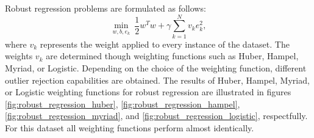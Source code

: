 \documentclass{article}
\begin{document}
        
        Robust regression problems are formulated as follows: 
        \begin{equation}\label{eq:robust_regression}
            \min_{w,b,e_k} \ \frac{1}{2} w^T w + \gamma \sum^N_{k=1} v_k e_k^2, 
        \end{equation}
        where $v_k$ represents the weight applied to every instance of the dataset. The weights $v_k$ are determined though weighting functions such as Huber, Hampel, Myriad, or Logistic. Depending on the choice of the weighting function, different outlier rejection capabilities are obtained. The results of Huber, Hampel, Myriad, or Logistic weighting functions for robust regression are illustrated in figures \ref{fig:robust_regression_huber}, \ref{fig:robust_regression_hampel}, \ref{fig:robust_regression_myriad}, and \ref{fig:robust_regression_logistic}, respectfully. For this dataset all weighting functions perform almost identically. 
\end{document}

